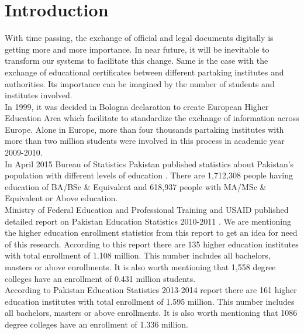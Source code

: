 \documentclass[12pt,a4paper,oneside]{book}
\begin{document}
\listoffigures
\listoftables

\resetpagenumbering

\chapter{Introduction}\label{ch-intro}

With time passing, the exchange of official and legal documents digitally is getting more and more importance. In near future, it will be inevitable to transform our systems to facilitate this change. Same is the case with the exchange of educational certificates between different partaking institutes and authorities. Its importance can be imagined by the number of students and institutes involved. \\

In 1999, it was decided in Bologna declaration to create European Higher Education Area which facilitate to standardize the exchange of information across Europe. Alone in Europe, more than four thousands partaking institutes with more than two million students were involved in this process in academic year 2009-2010. \\

In April 2015 Bureau of Statistics Pakistan published statistics about Pakistan's population with different levels of education \cite{Level of Edu}. There are 1,712,308 people having education of BA/BSc \& Equivalent and 618,937 people with MA/MSc \& Equivalent or Above education. \cite{Edu Stat} \\

Ministry of Federal Education and Professional Training and USAID published detailed report on Pakistan Education Statistics 2010-2011 \cite{Edu Stat}. We are mentioning the higher education enrollment statistics from this report to get an idea for need of this research. According to this report there are 135 higher education institutes with total enrollment of 1.108 million. This number includes all bachelors, masters or above enrollments. It is also worth mentioning that 1,558 degree colleges have an enrollment of 0.431 million students. \\ 

According to Pakistan Education Statistics 2013-2014 report there are 161 higher education institutes with total enrollment of 1.595 million. This number includes all bachelors, masters or above enrollments. It is also worth mentioning that 1086 degree colleges have an enrollment of 1.336 million. \cite{Edu Stat2}\\
\end{document}

